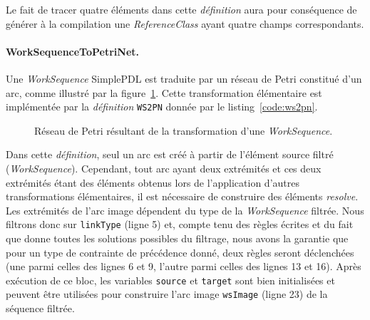 Le fait de tracer quatre éléments dans cette \emph{définition} aura pour
conséquence de générer à la compilation une \emph{ReferenceClass} ayant quatre
champs correspondants.

\FloatBarrier

\paragraph{WorkSequenceToPetriNet.} Une \emph{WorkSequence} SimplePDL est
traduite par un réseau de Petri constitué d'un arc, comme illustré par la
figure~\ref{fig:PNWorkSequence}. Cette transformation élémentaire est
implémentée par la \emph{définition} \texttt{WS2PN} donnée par le
listing~\ref{code:ws2pn}. 

\begin{figure}[h]
  \begin{center}
    
  \end{center}
  \caption{Réseau de Petri résultant de la transformation d'une \emph{WorkSequence}.}
  \label{fig:PNWorkSequence}
\end{figure}

Dans cette \emph{définition}, seul un arc est créé à partir de l'élément source
filtré (\emph{WorkSequence}). Cependant, tout arc ayant deux extrémités et ces
deux extrémités étant des éléments obtenus lors de l'application d'autres
transformations élémentaires, il est nécessaire de construire des éléments
\emph{resolve}. Les extrémités de l'arc image dépendent du type de la
\emph{WorkSequence} filtrée. Nous filtrons donc sur \texttt{linkType} (ligne 5)
et, compte tenu des règles écrites et du fait que {\tom} donne toutes les
solutions possibles du filtrage, nous avons la garantie que pour un type de
contrainte de précédence donné, deux règles seront déclenchées (une parmi
celles des lignes 6 et 9, l'autre parmi celles des lignes 13 et 16). Après
exécution de ce bloc, les variables \texttt{source} et \texttt{target} sont
bien initialisées et peuvent être utilisées pour construire l'arc image
\texttt{wsImage} (ligne 23) de la séquence filtrée.

\begin{figure}[h]
  \begin{center}
    
  \end{center}
\end{figure}

\FloatBarrier

